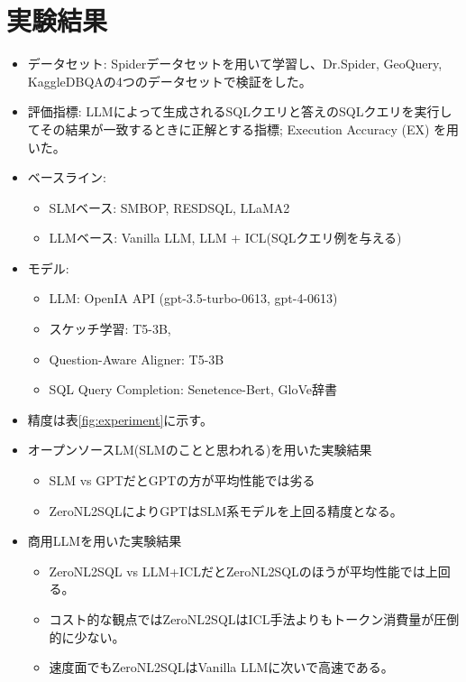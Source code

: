\documentclass[dvipdfmx,uplatex]{jsarticle}
\theoremstyle{remark}
\newenvironment{experiment}[1]{
    \begin{tcolorbox}[
        colframe=violet,
        colback=violet!10!white,
        colbacktitle=violet!40!white,
        coltitle=black,
        fonttitle=\bfseries,
        title={#1}
    ]
}{
    \end{tcolorbox}
}
\begin{document}
\section{実験結果}
\begin{experiment}{実験手法}
\begin{itemize}
    \item データセット: Spiderデータセットを用いて学習し、Dr.Spider, GeoQuery, KaggleDBQAの4つのデータセットで検証をした。
    \item 評価指標: LLMによって生成されるSQLクエリと答えのSQLクエリを実行してその結果が一致するときに正解とする指標; Execution Accuracy (EX) を用いた。
    \item ベースライン: 
    \begin{itemize}
        \item SLMベース: SMBOP, RESDSQL, LLaMA2
        \item LLMベース: Vanilla LLM, LLM + ICL(SQLクエリ例を与える)
    \end{itemize}
    \item モデル: 
    \begin{itemize}
        \item LLM: OpenIA API (gpt-3.5-turbo-0613, gpt-4-0613)
        \item スケッチ学習: T5-3B,
        \item Question-Aware Aligner: T5-3B
        \item SQL Query Completion: Senetence-Bert, GloVe辞書
    \end{itemize}
\end{itemize}
\end{experiment}

\begin{experiment}{実験結果}
\begin{itemize}
    \item 精度は表\ref{fig:experiment}に示す。
    \item オープンソースLM(SLMのことと思われる)を用いた実験結果
    \begin{itemize}
        \item SLM vs GPTだとGPTの方が平均性能では劣る
        \item ZeroNL2SQLによりGPTはSLM系モデルを上回る精度となる。
    \end{itemize}
    \item 商用LLMを用いた実験結果
    \begin{itemize}
        \item ZeroNL2SQL vs LLM+ICLだとZeroNL2SQLのほうが平均性能では上回る。
        \item コスト的な観点ではZeroNL2SQLはICL手法よりもトークン消費量が圧倒的に少ない。
        \item 速度面でもZeroNL2SQLはVanilla LLMに次いで高速である。
    \end{itemize}
\end{itemize}
\end{experiment}
\end{document}
